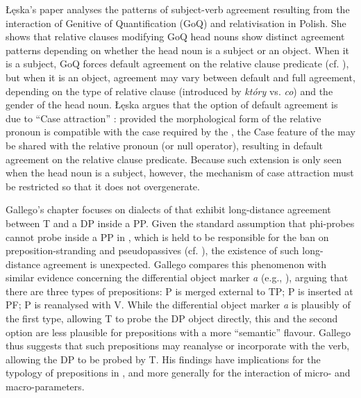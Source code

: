 \documentclass[output=paper]{langsci/langscibook}
\begin{document}
Łęska’s paper analyses the patterns of subject-verb agreement resulting from the interaction of Genitive of Quantification (GoQ) and relativisation in Polish. She shows that relative clauses modifying GoQ head nouns show distinct agreement patterns depending on whether the head noun is a subject or an object. When it is a subject, GoQ forces default agreement on the relative clause predicate (cf. \citealt{Leska2016}), but when it is an object, agreement may vary between default and full agreement, depending on the type of relative clause (introduced by \textit{który} vs. \textit{co}) and the gender of the head noun. Łęska argues that the option of default agreement is due to ``Case attraction'' \citep{Bader2006}: provided the morphological form of the relative pronoun is compatible with the case required by the , the Case feature of the  may be shared with the relative pronoun (or null operator), resulting in default agreement on the relative clause predicate. Because such extension is only seen when the head noun is a subject, however, the mechanism of case attraction must be restricted so that it does not overgenerate.

Gallego’s chapter focuses on dialects of  that exhibit long-distance agreement between T and a DP inside a PP. Given the standard assumption that phi-probes cannot probe inside a PP in , which is held to be responsible for the ban on preposition-stranding and pseudopassives (cf. \citealt{Law2006}), the existence of such long-distance agreement is unexpected. Gallego compares this phenomenon with similar evidence concerning the differential object marker \textit{a} (e.g., \citealt{Torrego1998,López2012}), arguing that there are three types of prepositions: P is merged external to TP; P is inserted at PF; P is reanalysed with V. While the differential object marker \textit{a} is plausibly of the first type, allowing T to probe the DP object directly, this and the second option are less plausible for prepositions with a more ``semantic'' flavour. Gallego thus suggests that such prepositions may reanalyse or incorporate with the verb, allowing the DP to be probed by T. His findings have implications for the typology of prepositions in , and more generally for the interaction of micro- and macro-parameters.
\end{document}
